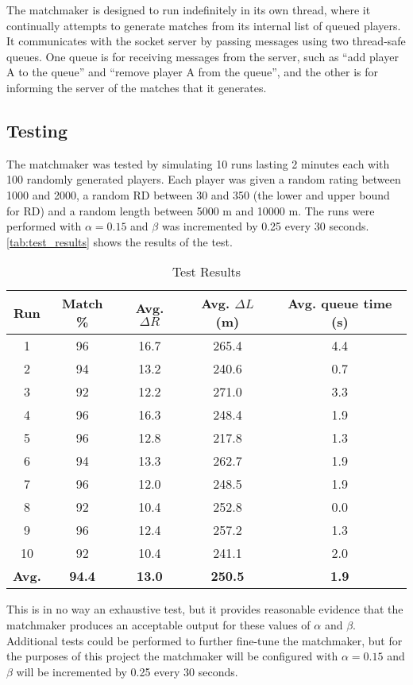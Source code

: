 The matchmaker is designed to run indefinitely in its own thread, where it continually attempts to generate matches from its internal list of queued players.
It communicates with the socket server by passing messages using two thread-safe queues.
One queue is for receiving messages from the server, such as ``add player A to the queue'' and ``remove player A from the queue'', and the other is for informing the server of the matches that it generates.

\subsection{Testing}
The matchmaker was tested by simulating 10 runs lasting 2 minutes each with 100 randomly generated players.
Each player was given a random rating between 1000 and 2000, a random RD between 30 and 350 (the lower and upper bound for RD) and a random length between 5000 m and 10000 m.
The runs were performed with $\alpha = 0.15$ and $\beta$ was incremented by 0.25 every 30 seconds.
\autoref{tab:test_results} shows the results of the test.

\begin{table}[!ht]
	\centering
	\begin{tabular}{c | c c c c}
		\textbf{Run}	& \textbf{Match \%}		& \textbf{Avg. $\Delta R$}		& \textbf{Avg. $\Delta L$ (m)}		& \textbf{Avg. queue time (s)} \\
		\hline
		1				& 96					& 16.7							& 265.4								& 4.4 \\
		2				& 94					& 13.2							& 240.6								& 0.7 \\
		3				& 92					& 12.2							& 271.0								& 3.3 \\
		4				& 96					& 16.3							& 248.4								& 1.9 \\
		5				& 96					& 12.8							& 217.8								& 1.3 \\
		6				& 94					& 13.3							& 262.7								& 1.9 \\
		7				& 96					& 12.0							& 248.5								& 1.9 \\
		8				& 92					& 10.4							& 252.8								& 0.0 \\
		9				& 96					& 12.4							& 257.2								& 1.3 \\
		10				& 92					& 10.4							& 241.1								& 2.0 \\
		\hline\hline
		\textbf{Avg.}	& \textbf{94.4}			& \textbf{13.0}					& \textbf{250.5}					& \textbf{1.9}
	\end{tabular}
	\caption{Test Results}
	\label{tab:test_results}
\end{table}

This is in no way an exhaustive test, but it provides reasonable evidence that the matchmaker produces an acceptable output for these values of $\alpha$ and $\beta$.
Additional tests could be performed to further fine-tune the matchmaker, but for the purposes of this project the matchmaker will be configured with $\alpha = 0.15$ and $\beta$ will be incremented by 0.25 every 30 seconds.
